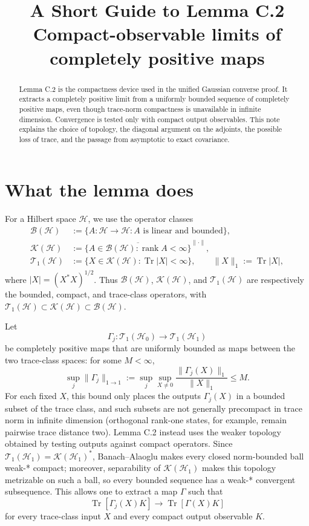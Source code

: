 \documentclass[11pt]{article}
\title{A Short Guide to Lemma C.2\\
\large Compact-observable limits of completely positive maps}
\author{}
\date{}
\newcommand{\Hc}{\mathcal H}
\newcommand{\T}{\mathcal T_1}
\newcommand{\K}{\mathcal K}
\newcommand{\Bop}{\mathcal B}
\newcommand{\Tr}{\operatorname{Tr}}
\begin{document}
\maketitle

\begin{abstract}
Lemma C.2 is the compactness device used in the unified Gaussian converse proof.
It extracts a completely positive limit from a uniformly bounded sequence of
completely positive maps, even though trace-norm compactness is unavailable
in infinite dimension.  Convergence is tested only with compact output
observables.  This note explains the choice of topology, the diagonal
argument on the adjoints, the possible loss of trace, and the passage from
asymptotic to exact covariance.
\end{abstract}

\section{What the lemma does}

For a Hilbert space $\Hc$, we use the operator classes
\[
\begin{aligned}
  \Bop(\Hc)
  &:=\{A:\Hc\to\Hc:A\text{ is linear and bounded}\},\\
  \K(\Hc)
  &:=\overline{\{A\in\Bop(\Hc):\operatorname{rank}A<\infty\}}^{\|\cdot\|},\\
  \T(\Hc)
  &:=\{X\in\K(\Hc):\Tr|X|<\infty\},
  \qquad \|X\|_1:=\Tr|X|,
\end{aligned}
\]
where $|X|=(X^*X)^{1/2}$.  Thus $\Bop(\Hc)$, $\K(\Hc)$, and
$\T(\Hc)$ are respectively the bounded, compact, and trace-class
operators, with
$\T(\Hc)\subset\K(\Hc)\subset\Bop(\Hc)$.

Let
\[
  \Gamma_j:\T(\Hc_0)\longrightarrow\T(\Hc_1)
\]
be completely positive maps that are uniformly bounded as maps between the
two trace-class spaces: for some $M<\infty$,
\[
  \sup_j\|\Gamma_j\|_{1\to1}
  :=\sup_j\sup_{X\ne0}\frac{\|\Gamma_j(X)\|_1}{\|X\|_1}
  \leq M.
\]
For each fixed $X$, this bound only places the outputs $\Gamma_j(X)$ in a
bounded subset of the trace class, and such subsets are not generally
precompact in trace norm in infinite dimension (orthogonal rank-one states,
for example, remain pairwise trace distance two).  Lemma C.2 instead uses the
weaker topology obtained by testing outputs against compact operators.  Since
$\T(\Hc_1)=\K(\Hc_1)^*$, Banach--Alaoglu makes every closed norm-bounded ball
weak-* compact; moreover, separability of $\K(\Hc_1)$ makes this topology
metrizable on such a ball, so every bounded sequence has a weak-* convergent
subsequence.  This allows one to extract a map $\Gamma$ such that
\begin{equation}\label{eq:weak-convergence}
  \Tr[\Gamma_j(X)K]\longrightarrow\Tr[\Gamma(X)K]
\end{equation}
for every trace-class input $X$ and every compact output observable $K$.
\end{document}
